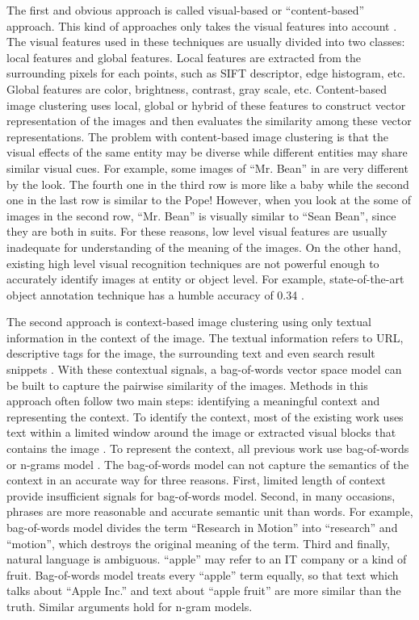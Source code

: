 The first and obvious approach is called visual-based or
``content-based'' approach. This kind of
approaches only takes the visual features into account \cite{Fu2011, ZhongLL11}.
The visual features used in these techniques are usually divided into two
classes: local features and global features. Local features are extracted
from the surrounding pixels for each points, such as SIFT descriptor, edge
histogram, etc. Global features are color, brightness, contrast, gray scale,
etc. Content-based image clustering uses local, global or hybrid of these
features to construct vector representation of the images and then evaluates
the similarity among these vector representations. 
The problem with content-based image clustering
is that the visual effects of the same entity may be diverse while different
entities may share similar visual cues. For example, some images of ``Mr. Bean''
in  are very different by the look.
The fourth one in the third row is more like a baby while
the second one in the last row is similar to the Pope!
However, when you look at the some of images in the second row,
``Mr. Bean'' is visually similar to ``Sean Bean'',
since they are both in suits. For these reasons, low level 
visual features are usually inadequate for understanding of 
the meaning of the images.
On the other hand, existing high level visual recognition
techniques are not powerful enough to accurately identify images at entity
or object level. For example, state-of-the-art object annotation technique has
a humble accuracy of 0.34 \cite{Li09scene}. 

The second approach is context-based image clustering using only
textual information in the context of the image.
The textual information refers to URL, descriptive tags for the image,
the surrounding text and even search result snippets \cite{Jing2006}. 
With these contextual signals, a bag-of-words vector space model can be built
to capture the pairwise similarity of the images. Methods in this approach
often follow two main steps: identifying a meaningful context
and representing the context. To identify the context, most of the existing
work uses text within a limited window around the image or
extracted visual blocks that contains the image \cite{VIPS}. To represent
the context, all previous work use bag-of-words or n-grams model \cite{Jing2006}.
The bag-of-words model can not capture the semantics of the context
in an accurate way for three reasons.
First, limited length of context provide insufficient signals
for bag-of-words model. Second, in many occasions, phrases are more
reasonable and accurate semantic unit than words.
For example, bag-of-words model divides the term ``Research in Motion''
into ``research'' and ``motion'', which destroys the original meaning of
the term. Third and finally, natural language is ambiguous. ``apple'' may refer
to an IT company or a kind of fruit. Bag-of-words model treats every ``apple'' term
equally, so that text which talks about ``Apple Inc.'' and text about
``apple fruit'' are more similar than the truth. Similar arguments
hold for n-gram models.

